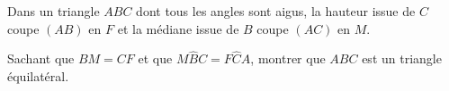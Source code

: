 \documentclass[varwidth]{standalone}
\begin{document}
    Dans un triangle $ABC$ dont tous les angles sont aigus, la hauteur issue de $C$ coupe $(AB)$ en $F$ et la m\'ediane issue de $B$ coupe $(AC)$ en $M$.

    Sachant que $BM = CF$ et que $M\hat{B}C = F\hat{C}A$, montrer que $ABC$ est un triangle \'equilat\'eral.
\end{document}
